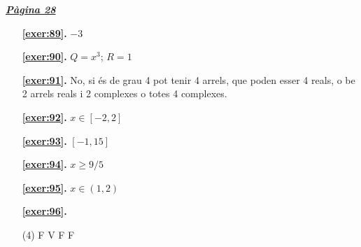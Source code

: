 
\hyperlink{page.28}{\textbf{\em Pàgina 28}}
\begin{enumerate}
\item[\fontfamily{phv}\selectfont\color{blue}\textbf{\ref{exer:89}. }] \label{ans:89} 
$-3$
 \end{enumerate}
\begin{enumerate}
\item[\fontfamily{phv}\selectfont\color{blue}\textbf{\ref{exer:90}. }] \label{ans:90} 
$Q=x^3$; $R=1$
\item[\fontfamily{phv}\selectfont\color{blue}\textbf{\ref{exer:91}. }] \label{ans:91} 
No, si és de grau 4 pot tenir 4 arrels, que poden esser 4 reals, o be 2 arrels reals i 2 complexes o totes 4 complexes.
\item[\fontfamily{phv}\selectfont\color{blue}\textbf{\ref{exer:92}. }] \label{ans:92} 
$x \in [-2, 2]$
\item[\fontfamily{phv}\selectfont\color{blue}\textbf{\ref{exer:93}. }] \label{ans:93} 
$[-1, 15]$
\item[\fontfamily{phv}\selectfont\color{blue}\textbf{\ref{exer:94}. }] \label{ans:94} 
$x \geq 9/5$ 
\item[\fontfamily{phv}\selectfont\color{blue}\textbf{\ref{exer:95}. }] \label{ans:95} 
$x\in (1,2)$



 \item[\fontfamily{phv}\selectfont\color{blue}\textbf{\ref{exer:96}. }] \label{ans:96}
 \begin{tasks}[column-sep=1em, item-indent=1.3333em](4)
	 \task F
	 \task V
	 \task F
	 \task F
\end{tasks}
 \end{enumerate}

 \vspace{1cm} 
 

\vspace{0.3cm}


